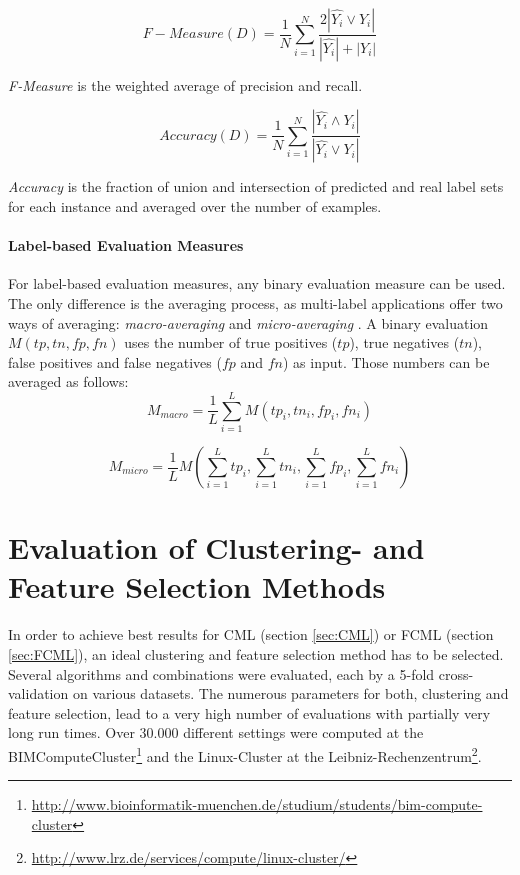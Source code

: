			\begin{equation}
				\label{eqn:fmeasure}
				F-Measure(D) = \frac{1}{N} \sum_{i=1}^{N} \frac{2|\hat{Y_i}\vee Y_i|}{|\hat{Y_i}|+|Y_i|}
			\end{equation}

			\textit{F-Measure} is the weighted average of precision and recall. 

			\begin{equation}
				\label{eqn:accuracy}
					Accuracy(D) = \frac{1}{N} \sum_{i=1}^{N} \frac{|\hat{Y_i}\wedge Y_i|}{|\hat{Y_i}\vee Y_i|}
			\end{equation}

				\textit{Accuracy} is the fraction of union and intersection of predicted and real label sets for each instance and averaged over the number of examples. 

			\paragraph*{Label-based Evaluation Measures}
				\label{para:labelmeasures}

				For label-based evaluation measures, any binary evaluation measure can be used. The only difference is the averaging process, as multi-label applications offer two ways of averaging: \textit{macro-averaging} and \textit{micro-averaging} \cite{Yang99anevaluation}. A binary evaluation $ M(tp,tn,fp,fn)$ uses the number of true positives ($tp$), true negatives ($tn$), false positives and false negatives ($fp$ and $fn$) as input. Those numbers can be averaged as follows:
				\begin{equation}
					\label{eqn:mmacro}
					M_{macro}=\frac{1}{L}\sum_{i=1}^L M({tp}_i,{tn}_i,{fp}_i,{fn}_i)
				\end{equation}

				\begin{equation}
					\label{eqn:mmacro}
					M_{micro}=\frac{1}{L} M(\sum_{i=1}^L {tp}_i,\sum_{i=1}^L {tn}_i,\sum_{i=1}^L {fp}_i,\sum_{i=1}^L {fn}_i)
				\end{equation}

	\section{Evaluation of Clustering- and Feature Selection Methods}
		\label{sec:evaluation}

		In order to achieve best results for CML (section \ref{sec:CML}) or FCML (section \ref{sec:FCML}), an ideal clustering and feature selection method has to be selected. Several algorithms and combinations were evaluated, each by a 5-fold cross-validation on various datasets. The numerous parameters for both, clustering and feature selection, lead to a very high number of evaluations with partially very long run times. Over $30.000$ different settings were computed at the BIMComputeCluster\footnote{\url{http://www.bioinformatik-muenchen.de/studium/students/bim-compute-cluster}} and the Linux-Cluster at the Leibniz-Rechenzentrum\footnote{\url{http://www.lrz.de/services/compute/linux-cluster/}}. 

